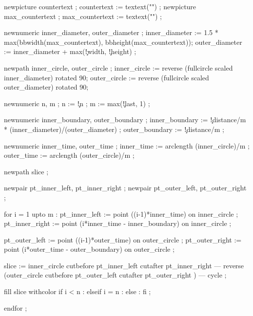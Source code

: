   newpicture countertext     ; countertext     := textext("\getvisualcountertext")    ;
  newpicture max_countertext ; max_countertext := textext("\getmaxvisualcountertext") ;

  newnumeric inner_diameter, outer_diameter ;
  inner_diameter := 1.5 * max(bbwidth(max_countertext), bbheight(max_countertext));
  outer_diameter := inner_diameter + 
          max(\visualcounterparameter\c!width, \visualcounterparameter\c!height) ;

  newpath inner_circle, outer_circle ;
  inner_circle := reverse (fullcircle scaled inner_diameter) rotated 90;
  outer_circle := reverse (fullcircle scaled outer_diameter) rotated 90;

  newnumeric n, m ;
  n := \visualcounterparameter\c!n ;
  m := max(\visualcounterparameter\c!last, 1) ;

  newnumeric inner_boundary, outer_boundary ;
  inner_boundary := \visualcounterparameter\c!distance/m * (inner_diameter)/(outer_diameter) ;
  outer_boundary := \visualcounterparameter\c!distance/m ;

  newnumeric inner_time, outer_time ;
  inner_time := arclength (inner_circle)/m ;
  outer_time := arclength (outer_circle)/m ;

  newpath slice ;

  newpair pt_inner_left, pt_inner_right ;
  newpair pt_outer_left, pt_outer_right ;

  for i = 1 upto m : 
    pt_inner_left  := point ((i-1)*inner_time)               on inner_circle ;
    pt_inner_right := point (i*inner_time - inner_boundary)  on inner_circle ;

    pt_outer_left  := point ((i-1)*outer_time)               on outer_circle ;
    pt_outer_right := point (i*outer_time - outer_boundary)  on outer_circle ;

    slice := inner_circle cutbefore pt_inner_left cutafter pt_inner_right 
       --- reverse (outer_circle cutbefore pt_outer_left cutafter pt_outer_right ) 
       --- cycle ;

    fill slice withcolor 
      if i < n     :  
      elseif i = n : 
      else         : 
      fi ;

  endfor ;

